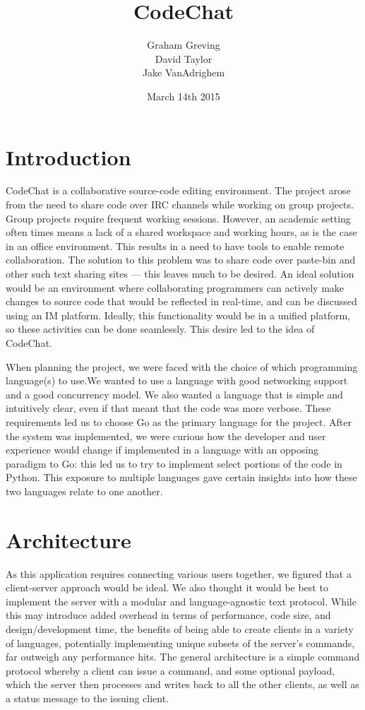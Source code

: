 \documentclass[12pt, letterpaper]{article}
\title{CodeChat}
\author{Graham Greving \\ David Taylor \\ Jake VanAdrighem}
\date{March 14th 2015}
\begin{document}
\maketitle

\section*{Introduction}


CodeChat is a collaborative source-code editing environment. The project
arose from the need to share code over IRC channels while working on
group projects. Group projects require frequent working sessions.
However, an academic setting often times means a lack of a shared
workspace and working hours, as is the case in an office environment.
This results in a need to have tools to enable remote collaboration.
The solution to this problem was to share code over paste-bin and other
such text sharing sites --- this leaves much to be desired. An ideal
solution would be an environment where collaborating programmers can
actively make changes to source code that would be reflected in
real-time, and can be discussed using an IM platform. Ideally, this
functionality would be in a unified platform, so these activities can
be done seamlessly. This desire led to the idea of CodeChat.


When planning the project, we were faced with the choice of which
programming language(s) to use.We wanted to use a language with good
networking support and a good concurrency model. We also wanted a
language that is simple and intuitively clear, even if that meant that
the code was more verbose. These requirements led us to choose Go as
the primary language for the project. After the system was implemented,
we were curious how the developer and user experience would change if
implemented in a language with an opposing paradigm to Go: this led us
to try to implement select portions of the code in Python. This
exposure to multiple languages gave certain insights into how these two
languages relate to one another.

\section*{Architecture}

As this application requires connecting various users together, we
figured that a client-server approach would be ideal. We also thought
it would be best to implement the server with a modular and
language-agnostic text protocol. While this may introduce added
overhead in terms of performance, code size, and design/development
time, the benefits of being able to create clients in a variety of
languages, potentially implementing unique subsets of the server's
commands, far outweigh any performance hits. The general architecture
is a simple command protocol whereby a client can issue a command, and
some optional payload, which the server then processes and writes back
to all the other clients, as well as a status message to the issuing
client.
\end{document}
